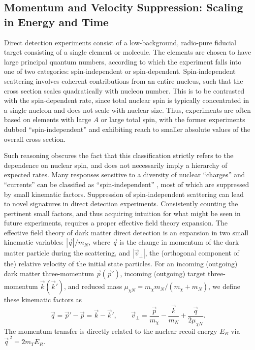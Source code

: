 \documentclass[11pt]{article}
\newcommand{\beq}{\begin{equation}} \newcommand{\eeq}{\end{equation}}
\def\qsq{\vec{q}^{\,2}}
\begin{document}
\subsection{Momentum and Velocity Suppression: Scaling in Energy and Time}

Direct detection experiments consist of a low-background, radio-pure fiducial target consisting of a single element or molecule. The elements are chosen to have large principal quantum numbers, according to which the experiment falls into one of two categories: spin-independent or spin-dependent. Spin-independent scattering involves coherent contributions from an entire nucleus, such that the cross section scales quadratically with nucleon number. This is to be contrasted with the spin-dependent rate, since total nuclear spin is typically concentrated in a single nucleon and does not scale with nuclear size. Thus, experiments are often based on elements with large $A$ or large total spin, with the former experiments dubbed ``spin-independent'' and exhibiting reach to smaller absolute values of the overall cross section.

Such reasoning obscures the fact that this classification strictly refers to the dependence on nuclear spin, and does not necessarily imply a hierarchy of expected rates. Many responses sensitive to a diversity of nuclear ``charges'' and ``currents'' can be classified as ``spin-independent'' \cite{Fitzpatrick:2012ix}, most of which are suppressed by small kinematic factors. Suppression of spin-independent scattering can lead to novel signatures in direct detection experiments. Consistently counting the pertinent small factors, and thus acquiring intuition for what might be seen in future experiments, requires a proper effective field theory expansion. The effective field theory of dark matter direct detection \cite{Fitzpatrick:2012ix, Anand:2013yka} is an expansion in two small kinematic variables: $|\vec q|/m_N$, where $\vec q$ is the change in momentum of the dark matter particle during the scattering, and $|\vec v_\perp|$, the (orthogonal component of the) relative velocity of the initial state particles. For an incoming (outgoing) dark matter three-momentum $\vec p(\vec p')$, incoming (outgoing) target three-momentum $\vec k(\vec k')$, and reduced mass $\mu_{\chi N} = m_\chi m_N/(m_\chi +m_N)$, we define these kinematic factors as \cite{Fitzpatrick:2012ix}
\beq \label{eq:kinematic-definitions}
\vec q=\vec p'-\vec p=\vec k-\vec k', \qquad \vec v_\perp=\frac{\vec p}{m_\chi}-\frac{\vec k}{m_N}+\frac{\vec q}{2\mu_{\chi N}}.
\eeq
The momentum transfer is directly related to the nuclear recoil energy $E_R$ via $\qsq=2m_TE_R$.
\end{document}
